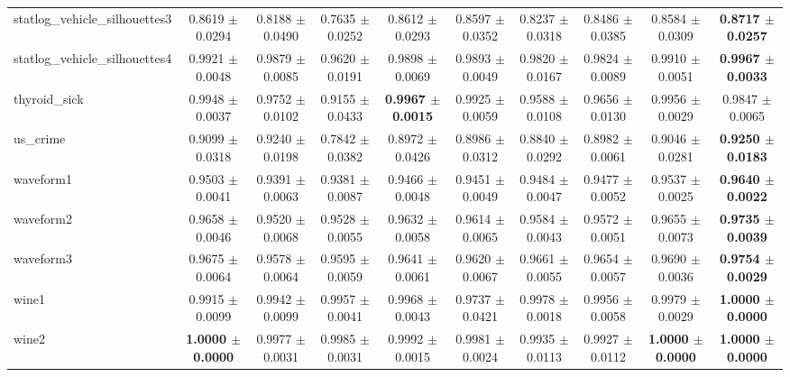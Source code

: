 \begin{table*}[htbp]
\begin{tabular}{lccccccccc}
            statlog\_vehicle\_silhouettes3 & 0.8619 $\pm$ 0.0294 & 0.8188 $\pm$ 0.0490 & 0.7635 $\pm$ 0.0252 & 0.8612 $\pm$ 0.0293 & 0.8597 $\pm$ 0.0352 & 0.8237 $\pm$ 0.0318 & 0.8486 $\pm$ 0.0385 & 0.8584 $\pm$ 0.0309 & \cellcolor{graybg}\textbf{0.8717 $\pm$ 0.0257} \\ 
            statlog\_vehicle\_silhouettes4 & 0.9921 $\pm$ 0.0048 & 0.9879 $\pm$ 0.0085 & 0.9620 $\pm$ 0.0191 & 0.9898 $\pm$ 0.0069 & 0.9893 $\pm$ 0.0049 & 0.9820 $\pm$ 0.0167 & 0.9824 $\pm$ 0.0089 & 0.9910 $\pm$ 0.0051 & \cellcolor{graybg}\textbf{0.9967 $\pm$ 0.0033} \\ 
            thyroid\_sick & 0.9948 $\pm$ 0.0037 & 0.9752 $\pm$ 0.0102 & 0.9155 $\pm$ 0.0433 & \cellcolor{graybg}\textbf{0.9967 $\pm$ 0.0015} & 0.9925 $\pm$ 0.0059 & 0.9588 $\pm$ 0.0108 & 0.9656 $\pm$ 0.0130 & 0.9956 $\pm$ 0.0029 & 0.9847 $\pm$ 0.0065 \\ 
            us\_crime & 0.9099 $\pm$ 0.0318 & 0.9240 $\pm$ 0.0198 & 0.7842 $\pm$ 0.0382 & 0.8972 $\pm$ 0.0426 & 0.8986 $\pm$ 0.0312 & 0.8840 $\pm$ 0.0292 & 0.8982 $\pm$ 0.0061 & 0.9046 $\pm$ 0.0281 & \cellcolor{graybg}\textbf{0.9250 $\pm$ 0.0183} \\ 
            waveform1 & 0.9503 $\pm$ 0.0041 & 0.9391 $\pm$ 0.0063 & 0.9381 $\pm$ 0.0087 & 0.9466 $\pm$ 0.0048 & 0.9451 $\pm$ 0.0049 & 0.9484 $\pm$ 0.0047 & 0.9477 $\pm$ 0.0052 & 0.9537 $\pm$ 0.0025 & \cellcolor{graybg}\textbf{0.9640 $\pm$ 0.0022} \\ 
            waveform2 & 0.9658 $\pm$ 0.0046 & 0.9520 $\pm$ 0.0068 & 0.9528 $\pm$ 0.0055 & 0.9632 $\pm$ 0.0058 & 0.9614 $\pm$ 0.0065 & 0.9584 $\pm$ 0.0043 & 0.9572 $\pm$ 0.0051 & 0.9655 $\pm$ 0.0073 & \cellcolor{graybg}\textbf{0.9735 $\pm$ 0.0039} \\ 
            waveform3 & 0.9675 $\pm$ 0.0064 & 0.9578 $\pm$ 0.0064 & 0.9595 $\pm$ 0.0059 & 0.9641 $\pm$ 0.0061 & 0.9620 $\pm$ 0.0067 & 0.9661 $\pm$ 0.0055 & 0.9654 $\pm$ 0.0057 & 0.9690 $\pm$ 0.0036 & \cellcolor{graybg}\textbf{0.9754 $\pm$ 0.0029} \\ 
            wine1 & 0.9915 $\pm$ 0.0099 & 0.9942 $\pm$ 0.0099 & 0.9957 $\pm$ 0.0041 & 0.9968 $\pm$ 0.0043 & 0.9737 $\pm$ 0.0421 & 0.9978 $\pm$ 0.0018 & 0.9956 $\pm$ 0.0058 & 0.9979 $\pm$ 0.0029 & \cellcolor{graybg}\textbf{1.0000 $\pm$ 0.0000} \\ 
            wine2 & \cellcolor{graybg}\textbf{1.0000 $\pm$ 0.0000} & 0.9977 $\pm$ 0.0031 & 0.9985 $\pm$ 0.0031 & 0.9992 $\pm$ 0.0015 & 0.9981 $\pm$ 0.0024 & 0.9935 $\pm$ 0.0113 & 0.9927 $\pm$ 0.0112 & \cellcolor{graybg}\textbf{1.0000 $\pm$ 0.0000} & \cellcolor{graybg}\textbf{1.0000 $\pm$ 0.0000} \\ 

\end{tabular}
\end{table*}
